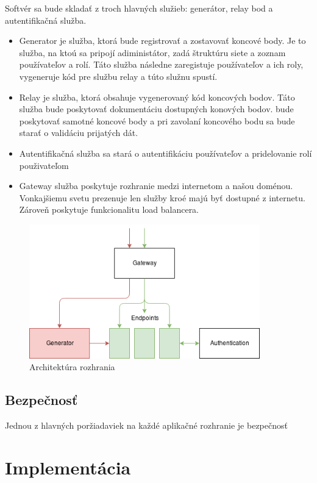 Softvér sa bude skladať z troch hlavných služieb: generátor, relay bod a autentifikačná služba.
\begin{itemize}
	\item Generator je služba, ktorá bude registrovať a zostavovať koncové body. Je to služba, na ktoú sa pripojí adiministátor, zadá štruktúru siete a zoznam používateľov a rolí. Táto služba následne zaregistuje používateľov a ich roly, vygeneruje kód pre službu relay a túto služnu spustí.
	\item Relay je služba, ktorá obsahuje vygenerovaný kód koncových bodov. Táto služba bude poskytovať dokumentáciu dostupných konových bodov. bude poskytovať samotné koncové body a pri zavolaní koncového bodu sa bude starať o validáciu prijatých dát.
	\item Autentifikačná služba sa stará o autentifikáciu používateľov a pridelovanie rolí použivateľom
	\item Gateway služba poskytuje rozhranie medzi internetom a našou doménou. Vonkajšiemu svetu prezenuje len služby kroé majú byť dostupné z internetu. Zároveň poskytuje funkcionalitu load balancera.
\end{itemize}


\begin{figure}[!htbp]
	\centering
	\includegraphics[width=10cm]{img/architecture.png}
	\caption{Architektúra rozhrania}
	\label{architecture}
\end{figure} 


\subsection{Bezpečnosť}
Jednou z hlavných poržiadaviek na každé aplikačné rozhranie je bezpečnosť 


\section{Implementácia} 

